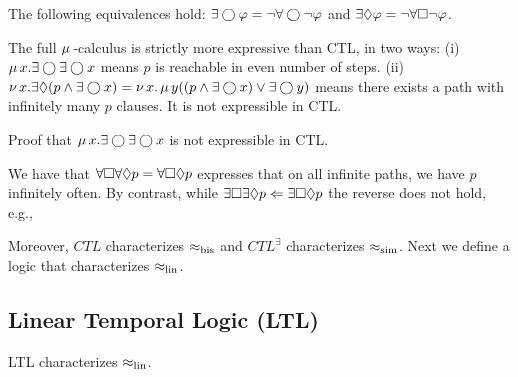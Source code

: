 \begin{remark}
    The following equivalences hold: $\exists \bigcirc \varphi = \neg \forall \bigcirc \neg \varphi$ and $\exists \lozenge \varphi = \neg \forall \square \neg \varphi$.
\end{remark}

\begin{remark}
    The full $\mu\,$-calculus is strictly more expressive than CTL, in two ways: (i) $\mu\, x.\exists \bigcirc \exists \bigcirc x$ means $p$ is reachable in even number of steps. (ii) $\nu\, x. \exists \lozenge (p \land \exists \bigcirc x) = \nu\, x .\, \mu\, y ((p \land \exists \bigcirc x) \lor \exists \bigcirc y)$ means there exists a path with infinitely many $p$ clauses. It is not expressible in CTL.
\end{remark}

\begin{exercise}
    Proof that $\mu\, x.\exists \bigcirc \exists \bigcirc x$ is not expressible in CTL.
\end{exercise}


\begin{remark}
    We have that $\forall \square \forall \lozenge p = \forall \square \lozenge p$ expresses that on all infinite paths, we have $p$ infinitely often. 
     By contrast, while
     $\exists \square \exists \lozenge p \Leftarrow  \exists \square \lozenge p$ the reverse does not hold, e.g.,
     \begin{center}
	\end{center}
 Moreover, $CTL$ characterizes $\approx_{\mathrm{bis}}$ and  $CTL^\exists$ characterizes $\approx_{\mathrm{sim}}$.
 Next we define a logic that characterizes $\approx_{\mathrm{lin}}$.
\end{remark}



\subsection{Linear Temporal Logic (LTL)}

\begin{remark}
    LTL characterizes $\approx_{\mathrm{lin}}$.
\end{remark}


